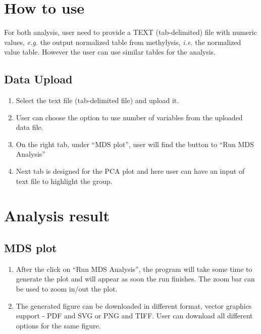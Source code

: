 \documentclass[
  a4paper,
  DIV=11,
  numbers=noendperiod,
  oneside,
  open=any]{scrreport}
\providecommand{\tightlist}{%
  \setlength{\itemsep}{0pt}\setlength{\parskip}{0pt}}\usepackage{longtable,booktabs,array}
\begin{document}
\section{How to use}\label{how-to-use-2}

For both analysis, user need to provide a TEXT (tab-delimited) file with
numeric values, \emph{e.g.} the output normalized table from methylysis,
\emph{i.e.} the normalized \beta value table. However the user can use
similar tables for the analysis.

\subsection{Data Upload}\label{data-upload}

\begin{enumerate}
\def\labelenumi{\arabic{enumi}.}
\tightlist
\item
  Select the text file (tab-delimited file) and upload it.
\item
  User can choose the option to use number of variables from the
  uploaded data file.
\item
  On the right tab, under ``MDS plot'', user will find the button to
  ``Run MDS Analysis''
\item
  Next tab is designed for the PCA plot and here user can have an input
  of text file to highlight the group.
\end{enumerate}

\section{Analysis result}\label{analysis-result}

\subsection{MDS plot}\label{mds-plot}

\begin{enumerate}
\def\labelenumi{\arabic{enumi}.}
\tightlist
\item
  After the click on ``Run MDS Analysis'', the program will take some
  time to generate the plot and will appear as soon the run finishes.
  The zoom bar can be used to zoom in/out the plot.
\item
  The generated figure can be downloaded in different format, vector
  graphics support - PDF and SVG or PNG and TIFF. User can download all
  different options for the same figure.\\
\end{enumerate}
\end{document}

